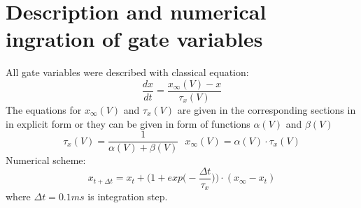 \documentclass[12pt]{article}
\begin{document}
\section{Description and numerical ingration of gate variables}
All gate variables were described with classical equation: 
\begin{equation}
\frac{dx}{dt} = \frac{x_{\infty}(V) - x}{\tau_x(V)}
\end{equation}
The equations for $x_{\infty}(V)$ and $\tau_x(V)$ are given in the corresponding sections in in explicit form or they can be given in form of functions  $\alpha(V)$ and $\beta(V)$
\begin{equation}
\tau_x(V) =  \frac{1}{\alpha(V) + \beta(V)} \ \ \ 
x_{\infty}(V) = \alpha(V) \cdot \tau_x(V)
\end{equation}
Numerical scheme:
\begin{equation}
x_{t + \Delta t} = x_t+\Big(1 + exp \Big(-\frac{\Delta t}{\tau_x} \Big) \Big)\cdot (x_{\infty}-x_t) 
\end{equation}
where $\Delta t = 0.1 ms$ is integration step.
\end{document}
